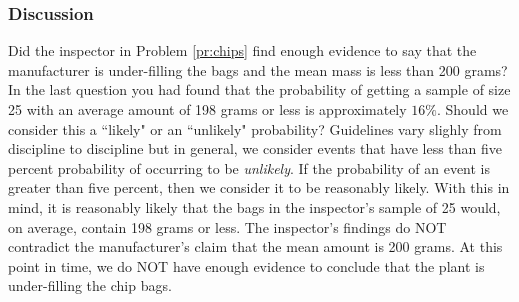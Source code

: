 \documentclass{ximera}
\begin{document}
\subsubsection{Discussion} Did the inspector in Problem \ref{pr:chips} find enough evidence to say that the manufacturer is under-filling the bags and the mean mass is less than 200 grams?  In the last question you had found that the probability of getting a sample of size 25 with an average amount of 198 grams or less is approximately $16\%$.  Should we consider this a ``likely" or an ``unlikely" probability?  Guidelines vary slighly from discipline to discipline but in general, we consider events that have less than five percent probability of occurring to be \emph{unlikely}.  If the probability of an event is greater than five percent, then we consider it to be reasonably likely.  With this in mind, it is reasonably likely that the bags in the inspector's sample of 25 would, on average, contain 198 grams or less. The inspector's findings do NOT contradict the manufacturer's claim that the mean amount is 200 grams.  At this point in time, we do NOT have enough evidence to conclude that the plant is under-filling the chip bags.

\end{document}
